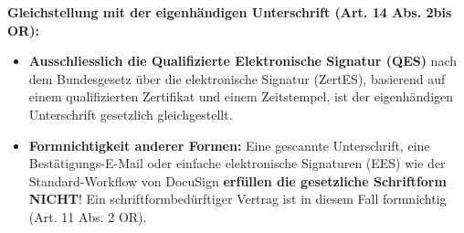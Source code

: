 \begin{theorem}
    \textbf{Gleichstellung mit der eigenhändigen Unterschrift (Art. 14 Abs. 2bis OR):}
    \begin{itemize}
        \item \textbf{Ausschliesslich die Qualifizierte Elektronische Signatur (QES)} nach dem Bundesgesetz über die elektronische Signatur (ZertES), basierend auf einem qualifizierten Zertifikat und einem Zeitstempel, ist der eigenhändigen Unterschrift gesetzlich gleichgestellt.
        \item \textbf{Formnichtigkeit anderer Formen:} Eine gescannte Unterschrift, eine Bestätigungs-E-Mail oder einfache elektronische Signaturen (EES) wie der Standard-Workflow von DocuSign \textbf{erfüllen die gesetzliche Schriftform NICHT}! Ein schriftformbedürftiger Vertrag ist in diesem Fall formnichtig (Art. 11 Abs. 2 OR).
    \end{itemize}
\end{theorem}

